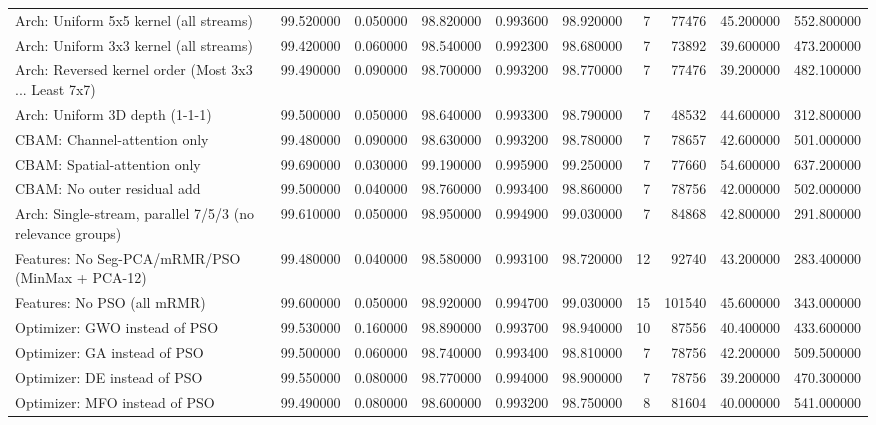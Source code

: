 \begin{tabular}{lrrrrrrrrr}
Arch: Uniform 5x5 kernel (all streams) & 99.520000 & 0.050000 & 98.820000 & 0.993600 & 98.920000 & 7 & 77476 & 45.200000 & 552.800000 \\
Arch: Uniform 3x3 kernel (all streams) & 99.420000 & 0.060000 & 98.540000 & 0.992300 & 98.680000 & 7 & 73892 & 39.600000 & 473.200000 \\
Arch: Reversed kernel order (Most 3x3 ... Least 7x7) & 99.490000 & 0.090000 & 98.700000 & 0.993200 & 98.770000 & 7 & 77476 & 39.200000 & 482.100000 \\
Arch: Uniform 3D depth (1-1-1) & 99.500000 & 0.050000 & 98.640000 & 0.993300 & 98.790000 & 7 & 48532 & 44.600000 & 312.800000 \\
CBAM: Channel-attention only & 99.480000 & 0.090000 & 98.630000 & 0.993200 & 98.780000 & 7 & 78657 & 42.600000 & 501.000000 \\
CBAM: Spatial-attention only & 99.690000 & 0.030000 & 99.190000 & 0.995900 & 99.250000 & 7 & 77660 & 54.600000 & 637.200000 \\
CBAM: No outer residual add & 99.500000 & 0.040000 & 98.760000 & 0.993400 & 98.860000 & 7 & 78756 & 42.000000 & 502.000000 \\
Arch: Single-stream, parallel 7/5/3 (no relevance groups) & 99.610000 & 0.050000 & 98.950000 & 0.994900 & 99.030000 & 7 & 84868 & 42.800000 & 291.800000 \\
Features: No Seg-PCA/mRMR/PSO (MinMax + PCA-12)  & 99.480000 & 0.040000 & 98.580000 & 0.993100 & 98.720000 & 12 & 92740 & 43.200000 & 283.400000 \\
Features: No PSO (all mRMR) & 99.600000 & 0.050000 & 98.920000 & 0.994700 & 99.030000 & 15 & 101540 & 45.600000 & 343.000000 \\
Optimizer: GWO instead of PSO & 99.530000 & 0.160000 & 98.890000 & 0.993700 & 98.940000 & 10 & 87556 & 40.400000 & 433.600000 \\
Optimizer: GA instead of PSO & 99.500000 & 0.060000 & 98.740000 & 0.993400 & 98.810000 & 7 & 78756 & 42.200000 & 509.500000 \\
Optimizer: DE instead of PSO & 99.550000 & 0.080000 & 98.770000 & 0.994000 & 98.900000 & 7 & 78756 & 39.200000 & 470.300000 \\
Optimizer: MFO instead of PSO & 99.490000 & 0.080000 & 98.600000 & 0.993200 & 98.750000 & 8 & 81604 & 40.000000 & 541.000000 \\
\bottomrule
\end{tabular}
